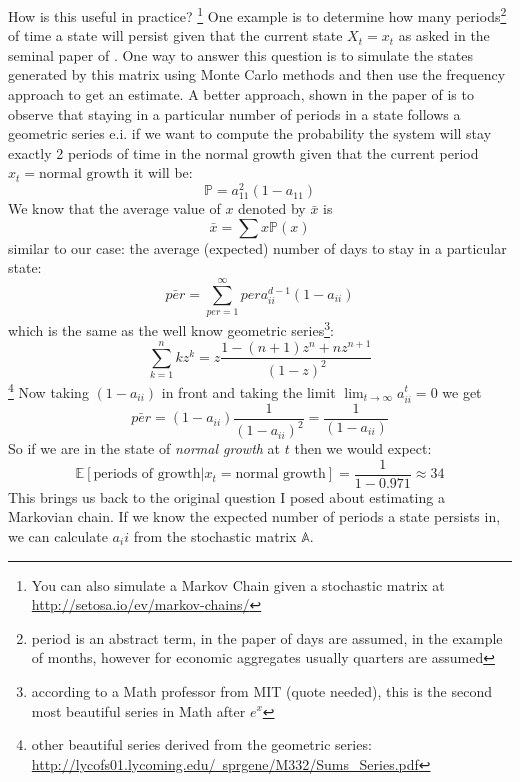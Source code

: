 \documentclass[a4paper,12pt]{article}
\theoremstyle{definition}
\begin{document}
How is this useful in practice? \footnote{You can also simulate a Markov Chain given a stochastic matrix at \href{http://setosa.io/ev/markov-chains/}{http://setosa.io/ev/markov-chains/}}
One example is to determine how many periods\footnote{period is an abstract term, in the paper of \cite{Rabiner89} days are assumed, in the example of \cite{hamilton02} months, however for economic aggregates usually quarters are assumed} of time a state will persist given that the current state $X_t = x_t$ as asked in the seminal paper of \citep{Rabiner89}. 
One way to answer this question is to simulate the states generated by this matrix using Monte Carlo methods and then use the frequency approach to get an estimate. A better approach, shown in the paper of \cite{Rabiner89} is to observe that staying in a particular number of periods in a state follows a geometric series e.i. if we want to compute the probability the system will stay exactly 2 periods of time in the normal growth given that the current period  $x_t = \text{normal growth}$ it will be:
\begin{equation}
\mathbb{P} = a_{11}^2(1-a_{11})
\end{equation}
We know that the average value of $x$ denoted by $\bar{x}$ is
\begin{equation}
\bar{x} = \sum x \mathbb{P}(x)
\end{equation}
similar to our case: the average (expected) number of days to stay in a particular state:
\begin{equation}
\bar{per} = \sum_{per=1}^\infty per a_{ii}^{d-1}(1-a_{ii})
\end{equation}
which is the same as the well know geometric series\footnote{according to a Math professor from MIT (quote needed), this is the second most beautiful series in Math after $e^x$ }:
\begin{equation}
\sum_{k=1}^n k z^k = z\frac{1-(n+1)z^n+nz^{n+1}}{(1-z)^2}
\end{equation}\footnote{other beautiful series derived from the geometric series: \href{http://lycofs01.lycoming.edu/~sprgene/M332/Sums\_Series.pdf}{ http://lycofs01.lycoming.edu/~sprgene/M332/Sums\_Series.pdf}}
Now taking $(1-a_{ii})$ in front and taking the limit $\lim_{t\to\infty} a_{ii}^t =0$ we get
\begin{equation}
\bar{per} = (1-a_{ii}) \frac{1}{(1-a_{ii})^2} = \frac{1}{(1-a_{ii})}
\end{equation}
So if we are in the state of \textit{normal growth} at $t$ then we would expect:
\begin{equation*}
\mathbb{E}[\text{periods of growth} | x_t = \text{normal growth}] = \frac{1}{1-0.971} \approx 34
\end{equation*}
This brings us back to the original question I posed about estimating a Markovian chain. If we know the expected number of periods a state persists in, we can calculate $a_ii$ from the stochastic matrix $\mathbb{A}$. 
\end{document}
